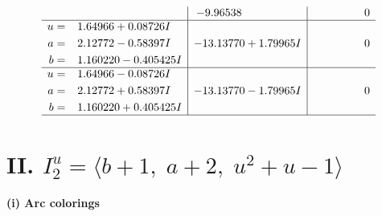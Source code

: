 \documentclass[1p]{elsarticle_modified}
\theoremstyle{definition}
\begin{document}
$$\begin{array}{c|c|c}
 & -9.96538\phantom{ +0.000000I} & \phantom{-0.000000 } 0 \\ \hline\begin{aligned}
u &= \phantom{-}1.64966 + 0.08726 I \\
a &= \phantom{-}2.12772 - 0.58397 I \\
b &= \phantom{-}1.160220 - 0.405425 I\end{aligned}
 & -13.13770 + 1.79965 I & \phantom{-0.000000 } 0 \\ \hline\begin{aligned}
u &= \phantom{-}1.64966 - 0.08726 I \\
a &= \phantom{-}2.12772 + 0.58397 I \\
b &= \phantom{-}1.160220 + 0.405425 I\end{aligned}
 & -13.13770 - 1.79965 I & \phantom{-0.000000 } 0\\
 \hline 
 \end{array}$$\newpage\newpage\renewcommand{\arraystretch}{1}
\centering \section*{II. $I^u_{2}= \langle b+1,\;a+2,\;u^2+u-1 \rangle$}
\flushleft \textbf{(i) Arc colorings}\\
\end{document}
